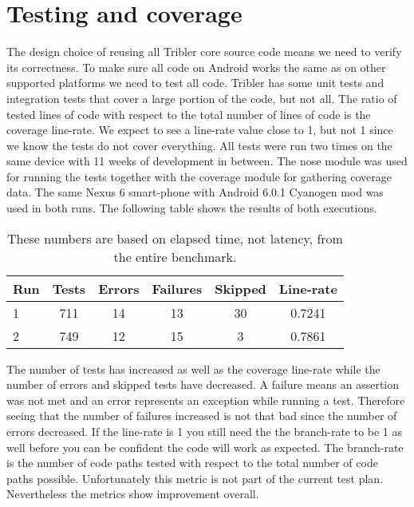 \section{Testing and coverage}
The design choice of reusing all Tribler core source code means we need to verify its correctness.
To make sure all code on Android works the same as on other supported platforms we need to test all code.
Tribler has some unit tests and integration tests that cover a large portion of the code, but not all.
The ratio of tested lines of code with respect to the total number of lines of code is the coverage line-rate.
We expect to see a line-rate value close to 1, but not 1 since we know the tests do not cover everything.
All tests were run two times on the same device with 11 weeks of development in between.
The nose module was used for running the tests together with the coverage module for gathering coverage data.
The same Nexus 6 smart-phone with Android 6.0.1 Cyanogen mod was used in both runs.
The following table shows the results of both executions.
\begin{table}[h]
	\begin{tabular}{l | *{5}{c}}
		Run & Tests & Errors & Failures & Skipped & Line-rate \\ \hline
		1     & 711   & 14       & 13          & 30          & 0.7241 \\ \hline
		2     & 749   & 12       & 15          & 3            & 0.7861 \\ \hline
	\end{tabular}
	\caption[Total response time statistics]{These numbers are based on elapsed time, not latency, from the entire benchmark.}
	\label{table:testing_coverage}
\end{table}
The number of tests has increased as well as the coverage line-rate while the number of errors and skipped tests have decreased.
A failure means an assertion was not met and an error represents an exception while running a test.
Therefore seeing that the number of failures increased is not that bad since the number of errors decreased.
If the line-rate is 1 you still need the the branch-rate to be 1 as well before you can be confident the code will work as expected.
The branch-rate is the number of code paths tested with respect to the total number of code paths possible.
Unfortunately this metric is not part of the current test plan.
Nevertheless the metrics show improvement overall.


